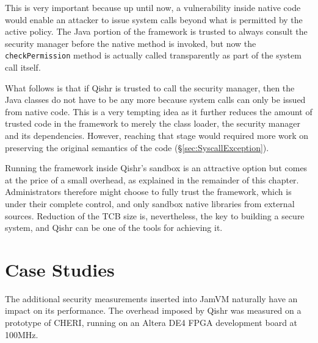 \documentclass[a4paper,12pt,twoside,openright]{report}
\begin{document}
This is very important because up until now, a vulnerability inside native code would enable an attacker to issue system calls beyond what is permitted by the active policy. The Java portion of the framework is trusted to always consult the security manager before the native method is invoked, but now the \texttt{checkPermission} method is actually called transparently as part of the system call itself. 

What follows is that if Qishr is trusted to call the security manager, then the Java classes do not have to be any more because system calls can only be issued from native code. This is a very tempting idea as it further reduces the amount of trusted code in the framework to merely the class loader, the security manager and its dependencies. However, reaching that stage would required more work on preserving the original semantics of the code (\S\ref{sec:SyscallException}).

Running the framework inside Qishr's sandbox is an attractive option but comes at the price of a small overhead, as explained in the remainder of this chapter. Administrators therefore might choose to fully trust the framework, which is under their complete control, and only sandbox native libraries from external sources. Reduction of the TCB size is, nevertheless, the key to building a secure system, and Qishr can be one of the tools for achieving it.

\section{Case Studies}

The additional security measurements inserted into JamVM naturally have an impact on its performance. The overhead imposed by Qishr was measured on a prototype of CHERI, running on an Altera DE4 FPGA development board at 100MHz. 
\end{document}
